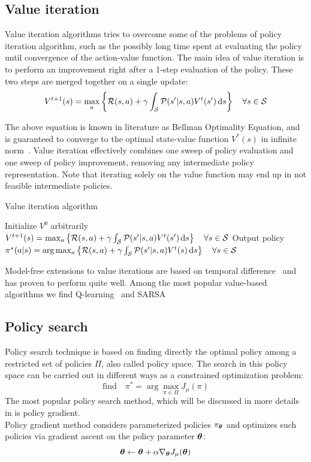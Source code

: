 \subsection{Value iteration}
Value iteration algorithms tries to overcome some of the problems of policy iteration algorithm, such as the possibly long time spent at evaluating the policy until convergence of the action-value function. The main idea of value iteration is to perform an improvement right after a 1-step evaluation of the policy. These two steps are merged together on a single update:
\[
V^{t+1}(s) = \max_a \left\{ \mathcal{R}(s,a) + \gamma\int_{\mathcal{S}} \mathcal{P}(s'|s,a)V^{t}(s')\, \textrm{d} s \right\}\quad\forall s \in \mathcal{S}
\] 

The above equation is known in literature as Bellman Optimality Equation, and is guaranteed to converge to the optimal state-value function $V^*(s)$ in infinite norm~\cite{BELLMAN1958228}. Value iteration effectively combines one sweep of policy evaluation and one sweep of policy improvement, removing any intermediate policy representation. Note that iterating solely on the value function may end up in not feasible intermediate policies.

\begin{algorithm}[t]
\caption{Value iteration algorithm}
\begin{algorithmic}
\State Initialize $V^0$ arbitrarily
\State $V^{t+1}(s) = \max_a \left\{ \mathcal{R}(s,a) + \gamma\int_{\mathcal{S}} \mathcal{P}(s'|s,a)V^{t}(s')\, \textrm{d} s \right\}\quad\forall s \in \mathcal{S}$
\EndFor
\State Output policy $\pi^*(a|s)=\arg\max_a\left\{ \mathcal{R}(s,a) + \gamma\int_{\mathcal{S}}\mathcal{P}(s'|s,a)V^t(s) \, \textrm{d} s\right\}\quad\forall s\in\mathcal{S}$
\end{algorithmic}
\end{algorithm}

Model-free extensions to value iterations are based on temporal difference~\cite{Sutton1988} and has proven to perform quite well. Among the most popular value-based algorithms we find Q-learning~\cite{Watkins1992} and SARSA~\cite{sarsa}


\subsection{Policy search}
Policy search technique is based on finding directly the optimal policy among a restricted set of policies $\Pi$, also called policy space. The search in this policy space can be carried out in different ways as a constrained optimization problem:
\[
\textrm{find}\quad \pi^* = \arg\max_{\pi\in\Pi}J_\mu(\pi)
\]
The most popular policy search method, which will be discussed in more details in  is policy gradient.\\
Policy gradient method considers parameterized policies $\pi_{{\boldsymbol{\theta}}}$ and optimizes such policies via gradient ascent on the policy parameter ${\boldsymbol{\theta}}$:
\[
{\boldsymbol{\theta}} \gets {\boldsymbol{\theta}} + \alpha\nabla_{{\boldsymbol{\theta}}}J_\mu({\boldsymbol{\theta}})
\]

